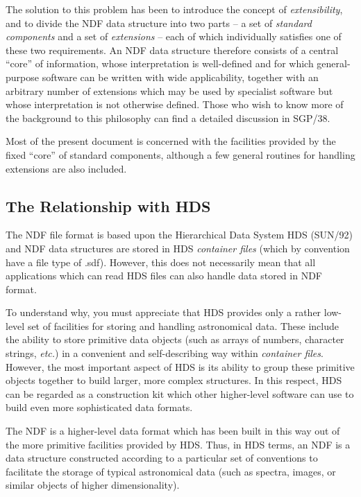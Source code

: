 \documentclass[twoside,11pt]{article}
\newcommand{\xref}[3]{#1}
\newcommand{\xlabel}[1]{}
\newcommand{\st}[1]{{\em{#1}}}
\begin{document}
The solution to this problem has been to introduce the concept of
\st{extensibility}, and to divide the NDF data structure into two
parts -- a set
of \st{standard components\/} and a set of \st{extensions\/} -- each of which
individually satisfies one of these two requirements. 
An NDF data structure therefore consists of a central ``core'' of
information, whose interpretation is well-defined and for which
general-purpose software can be written with wide applicability, together
with an arbitrary number of extensions which may be used by specialist
software but whose interpretation is not otherwise defined. 
Those who wish to know more of the background to this philosophy can find a 
detailed discussion in \xref{SGP/38}{sgp38}{}.

Most of the present document is concerned with the facilities provided by
the fixed ``core'' of standard components, although a few general routines
for handling extensions are also included. 

\subsection{\xlabel{the_relationship_with_hds}The Relationship with HDS}

The NDF file format is based upon the Hierarchical Data System HDS
(\xref{SUN/92}{sun92}{}) and NDF data structures are stored in HDS
\st{container files\/} (which by convention have a file type of
.sdf).  However, this does not necessarily mean that all applications
which can read HDS files can also handle data stored in NDF format.

To understand why, you must appreciate that HDS provides only a rather
low-level set of facilities for storing and handling astronomical data.
These include the ability to store primitive \xref{data
objects}{sun92}{HDS_objects} (such as arrays of numbers, character
strings, \st{etc.}) in a convenient and self-describing way within
\st{container files}.
However, the most important aspect of HDS is its ability to group these
primitive objects together to build larger, more complex structures. 
In this respect, HDS can be regarded as a construction kit which other
higher-level software can use to build even more sophisticated data formats.

The NDF is a higher-level data format which has been built in this way out 
of the more primitive facilities provided by HDS.
Thus, in HDS terms, an NDF is a data structure constructed according to a
particular set of conventions to facilitate the storage of typical
astronomical data (such as spectra, images, or similar objects of higher
dimensionality). 
\end{document}
